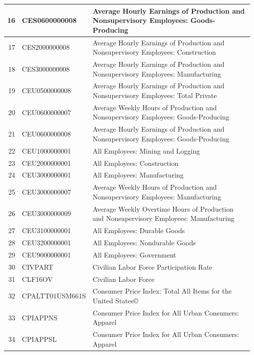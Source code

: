 \documentclass[12pt]{article}
\begin{document}
\begin{table}[ht]
\label{fred data 2}
\centering
\begin{tabular}{r|p{4cm}p{11cm}}
    \hline
	16 & CES0600000008 & Average Hourly Earnings of Production and Nonsupervisory Employees: Goods-Producing \\
	\hline
	17 & CES2000000008 & Average Hourly Earnings of Production and Nonsupervisory Employees: Construction \\ 
	\hline
	18 & CES3000000008 & Average Hourly Earnings of Production and Nonsupervisory Employees: Manufacturing \\ 	  \hline
	19 & CEU0500000008 & Average Hourly Earnings of Production and Nonsupervisory Employees: Total Private \\ 
	\hline
	20 & CEU0600000007 & Average Weekly Hours of Production and Nonsupervisory Employees: Goods-Producing \\ 
	\hline
	21 & CEU0600000008 & Average Hourly Earnings of Production and Nonsupervisory Employees: Goods-Producing \\ 
	\hline
	22 & CEU1000000001 & All Employees: Mining and Logging \\ 
	\hline
	23 & CEU2000000001 & All Employees: Construction \\ 
	\hline
	24 & CEU3000000001 & All Employees: Manufacturing \\ 
	\hline
	25 & CEU3000000007 & Average Weekly Hours of Production and Nonsupervisory Employees: Manufacturing \\ 
	\hline
	26 & CEU3000000009 & Average Weekly Overtime Hours of Production and Nonsupervisory Employees: Manufacturing \\ 
	\hline
	27 & CEU3100000001 & All Employees: Durable Goods \\ 
	\hline
	28 & CEU3200000001 & All Employees: Nondurable Goods \\ 
	\hline
	29 & CEU9000000001 & All Employees: Government \\ 
	\hline
	30 & CIVPART & Civilian Labor Force Participation Rate \\ 
	\hline
	31 & CLF16OV & Civilian Labor Force \\ 
	\hline
	32 & CPALTT01USM661S & Consumer Price Index: Total All Items for the United States© \\ 
	\hline
	33 & CPIAPPNS & Consumer Price Index for All Urban Consumers: Apparel \\ 
	\hline
	34 & CPIAPPSL & Consumer Price Index for All Urban Consumers: Apparel \\ 

\end{tabular}
\end{table}
\end{document}
